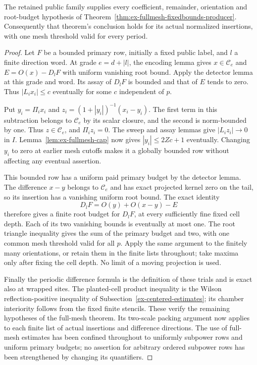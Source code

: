 \begin{proposition}
\label{prop:fullmesh-selected-supplier}
The retained public family supplies every coefficient, remainder,
orientation and root-budget hypothesis of
Theorem~\ref{thm:ex-fullmesh-fixedbounds-producer}. Consequently that
theorem's conclusion holds for its actual normalized insertions, with
one mesh threshold valid for every period.
\end{proposition}
\begin{proof}
Let $F$ be a bounded primary row, initially a fixed public label, and
$l$ a finite direction word. At grade $e=d+|l|$, the encoding lemma
gives $x\in\mathscr C_e$ and $E=O(x)-D_lF$ with uniform vanishing
root bound. Apply the detector lemma at this grade and word. Its assay
of $D_lF$ is bounded and that of $E$ tends to zero. Thus $|L_ix_i|\le c$
eventually for some $c$ independent of $p$.

Put $y_i=\Pi_i x_i$ and
$z_i=(1+|y_i|)^{-1}(x_i-y_i)$. The first term in this subtraction
belongs to $\mathscr C_e$ by its scalar closure, and the second is
norm-bounded by one. Thus $z\in\mathscr C_e$, and $\Pi_i z_i=0$.
The sweep and assay lemmas give $|L_i z_i|\to0$ in $I$.
Lemma~\ref{lem:ex-fullmesh-cap} now gives $|y_i|\le2Zc+1$ eventually.
Changing $y_i$ to zero at earlier mesh cutoffs makes it a globally
bounded row without affecting any eventual assertion.

This bounded row has a uniform paid primary budget by the detector
lemma. The difference $x-y$ belongs to $\mathscr C_e$ and has exact
projected kernel zero on the tail, so its insertion has a vanishing
uniform root bound. The exact identity
\[
               D_lF=O(y)+O(x-y)-E
\]
therefore gives a finite root budget for $D_lF$, at every sufficiently
fine fixed cell depth. Each of its two vanishing bounds is eventually
at most one. The root triangle inequality gives the sum of the primary
budget and two, with one common mesh threshold valid for all $p$.
Apply the same argument to the finitely many orientations, or retain
them in the finite lists throughout; take maxima only after fixing the
cell depth. No limit of a moving projection is used.

Finally the periodic difference formula is the definition of these
trials and is exact also at wrapped sites. The planted-cell product
inequality is the Wilson reflection-positive inequality of
Subsection~\ref{ex-centered-estimates}; its chamber interiority follows
from the fixed finite stencils. These verify the remaining hypotheses
of the full-mesh theorem. Its two-scale packing argument now applies
to each finite list of actual insertions and difference directions.
The use of full-mesh estimates has been confined throughout to
uniformly subpower rows and uniform primary budgets; no assertion for
arbitrary ordered subpower rows has been strengthened by changing its
quantifiers.
\end{proof}

